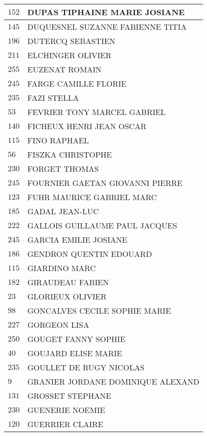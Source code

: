 \begin{xltabular}{\linewidth}{|l|X|}
    \hline
    $152$ & DUPAS TIPHAINE MARIE JOSIANE \\
    \hline
    $145$ & DUQUESNEL SUZANNE FABIENNE TITIA \\
    \hline
    $196$ & DUTERCQ SEBASTIEN \\
    \hline
    $211$ & ELCHINGER OLIVIER \\
    \hline
    $255$ & EUZENAT ROMAIN \\
    \hline
    $245$ & FARGE CAMILLE FLORIE \\
    \hline
    $235$ & FAZI STELLA \\
    \hline
    $53$ & FEVRIER TONY MARCEL GABRIEL \\
    \hline
    $140$ & FICHEUX HENRI JEAN OSCAR \\
    \hline
    $115$ & FINO RAPHAEL \\
    \hline
    $56$ & FISZKA CHRISTOPHE \\
    \hline
    $230$ & FORGET THOMAS \\
    \hline
    $245$ & FOURNIER GAETAN GIOVANNI PIERRE \\
    \hline
    $123$ & FUHR MAURICE GABRIEL MARC \\
    \hline
    $185$ & GADAL JEAN-LUC \\
    \hline
    $222$ & GALLOIS GUILLAUME PAUL JACQUES \\
    \hline
    $245$ & GARCIA EMILIE JOSIANE \\
    \hline
    $186$ & GENDRON QUENTIN EDOUARD \\
    \hline
    $115$ & GIARDINO MARC \\
    \hline
    $182$ & GIRAUDEAU FABIEN \\
    \hline
    $23$ & GLORIEUX OLIVIER \\
    \hline
    $98$ & GONCALVES CECILE SOPHIE MARIE \\
    \hline
    $227$ & GORGEON LISA \\
    \hline
    $250$ & GOUGET FANNY SOPHIE \\
    \hline
    $40$ & GOUJARD ELISE MARIE \\
    \hline
    $235$ & GOULLET DE RUGY NICOLAS \\
    \hline
    $9$ & GRANIER JORDANE DOMINIQUE ALEXAND \\
    \hline
    $131$ & GROSSET STEPHANE \\
    \hline
    $230$ & GUENERIE NOEMIE \\
    \hline
    $120$ & GUERRIER CLAIRE \\

\end{xltabular}
